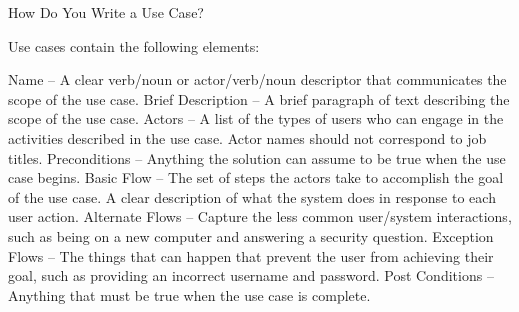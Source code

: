 \documentclass[12pt]{report} %
\begin{document}
\ifx
How Do You Write a Use Case?

Use cases contain the following elements:

Name – A clear verb/noun or actor/verb/noun descriptor that communicates the scope of the use case.
Brief Description – A brief paragraph of text describing the scope of the use case.
Actors – A list of the types of users who can engage in the activities described in the use case. Actor names should not correspond to job titles.
Preconditions – Anything the solution can assume to be true when the use case begins.
Basic Flow – The set of steps the actors take to accomplish the goal of the use case. A clear description of what the system does in response to each user action.
Alternate Flows – Capture the less common user/system interactions, such as being on a new computer and answering a security question.
Exception Flows – The things that can happen that prevent the user from achieving their goal, such as providing an incorrect username and password.
Post Conditions – Anything that must be true when the use case is complete.
\fi
\end{document}
